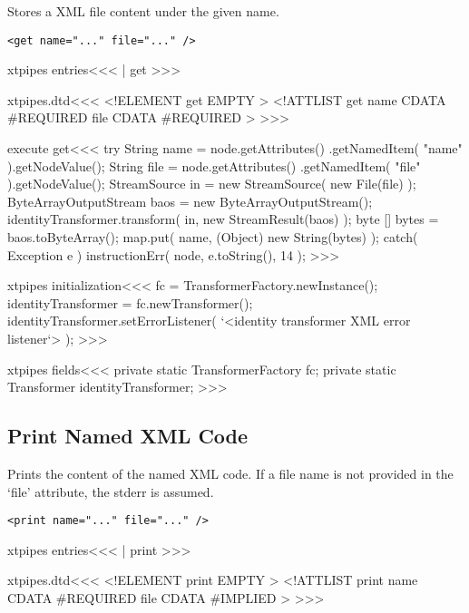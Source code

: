 \documentclass{article}
\begin{document}
{Stores a XML file content under the given name.

\begin{verbatim}
<get name="..." file="..." />
\end{verbatim}


\<xtpipes entries\><<<
| get
>>>


\<xtpipes.dtd\><<<
<!ELEMENT get EMPTY >  
<!ATTLIST get
          name CDATA #REQUIRED 
          file CDATA #REQUIRED
>
>>>


\<execute get\><<<
try {
  String name = node.getAttributes()
                  .getNamedItem( "name" ).getNodeValue();
  String file = node.getAttributes()
               .getNamedItem( "file" ).getNodeValue();
  StreamSource in   = new StreamSource( new File(file) );   
  ByteArrayOutputStream baos = new ByteArrayOutputStream();
  identityTransformer.transform( in, new StreamResult(baos) );
  byte [] bytes = baos.toByteArray();
  map.put( name, (Object) new String(bytes) );
} catch( Exception e ){  
   instructionErr( node, e.toString(), 14 );   
} 
>>>



\<xtpipes initialization\><<<
fc = TransformerFactory.newInstance();
identityTransformer =  fc.newTransformer();  
identityTransformer.setErrorListener( 
    `<identity transformer XML error listener`> );
>>>

\<xtpipes fields\><<<
private static TransformerFactory fc;
private static Transformer identityTransformer;
>>>



\subsection{Print Named XML Code}

Prints the content of the named XML code. If a file name is not
provided in the `file' attribute,
the stderr is assumed.

\begin{verbatim}
<print name="..." file="..." />
\end{verbatim}



\<xtpipes entries\><<<
| print
>>>


\<xtpipes.dtd\><<<
<!ELEMENT print EMPTY >  
<!ATTLIST print
          name CDATA #REQUIRED 
          file CDATA #IMPLIED
>
>>>



}
\end{document}
